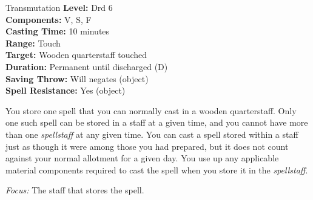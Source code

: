 {Transmutation}
{
	\textbf{Level:}
	Drd 6\\
	\textbf{Components:}
	V, S, F\\
	\textbf{Casting Time:}
	10 minutes\\
	\textbf{Range:}
	Touch\\
	\textbf{Target:}
	Wooden quarterstaff touched\\
	\textbf{Duration:}
	Permanent until discharged (D)\\
	\textbf{Saving Throw:}
	Will negates (object)\\
	\textbf{Spell Resistance:}
	Yes (object)\\
}
{
	You store one spell that you can normally cast in a wooden quarterstaff. Only one such spell can be stored in a staff at a given time, and you cannot have more than one \emph{spellstaff} at any given time. You can cast a spell stored within a staff just as though it were among those you had prepared, but it does not count against your normal allotment for a given day. You use up any applicable material components required to cast the spell when you store it in the \emph{spellstaff}.

	\textit{Focus:}
	The staff that stores the spell.

}
